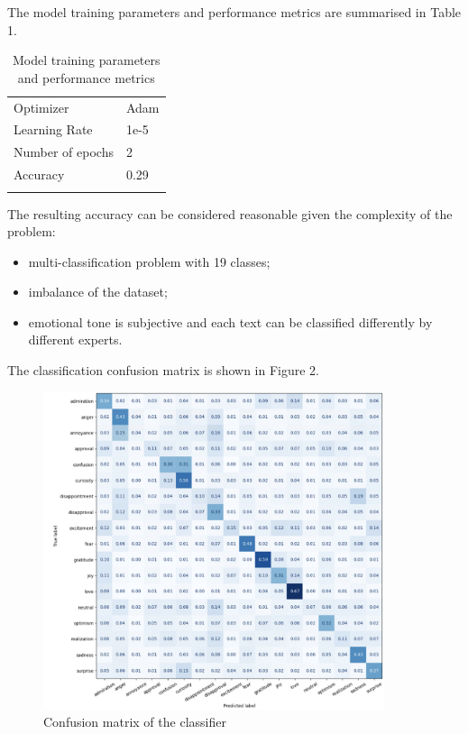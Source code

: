 \documentclass[pdflatex,sn-mathphys-num]{sn-jnl}%
\begin{document}
The model training parameters and performance metrics are summarised in Table 1.
\begin{table}[h]
	\caption{Model training parameters and performance metrics}\label{tab_2-1}%
	\begin{tabular}{@{}p{4cm}p{4cm}}
		\toprule
		Optimizer & Adam \\ 
		Learning Rate & 1e-5 \\ 
		Number of epochs & 2 \\
		Accuracy & 0.29\\ 
		\botrule
	\end{tabular}
\end{table}

The resulting accuracy can be considered reasonable given the complexity of the problem:
\begin{itemize}
	\item multi-classification problem with 19 classes; 
	\item imbalance of the dataset;
	\item emotional tone is subjective and each text can be classified differently by different experts.
\end{itemize}

The classification confusion matrix is shown in Figure 2.
\begin{figure}[h]
	\centering
	\includegraphics[width=10cm]{f2-confusion_matrix.png}
	\caption{Confusion matrix of the classifier}
\end{figure}
\end{document}
